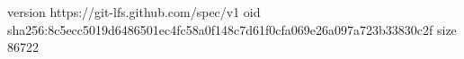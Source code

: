 version https://git-lfs.github.com/spec/v1
oid sha256:8c5ecc5019d6486501ec4fc58a0f148c7d61f0cfa069e26a097a723b33830c2f
size 86722

